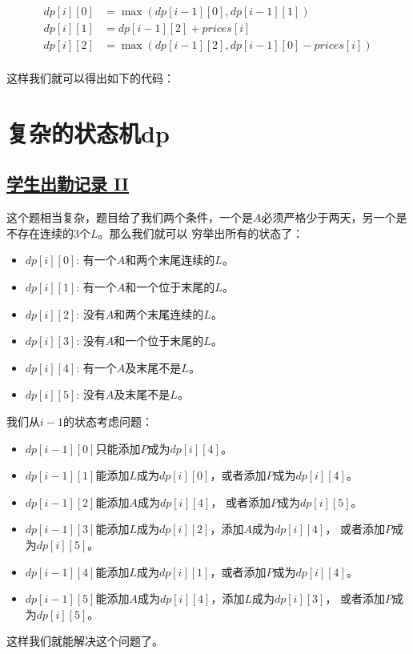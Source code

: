 \documentclass[../../main.tex]{subfiles}
\begin{document}
\begin{align*}
  dp[i][0] &= \max(dp[i - 1][0], dp[i - 1][1]) \\
  dp[i][1] &= dp[i - 1][2] + prices[i] \\
  dp[i][2] &= \max(dp[i - 1][2], dp[i - 1][0] - prices[i]) \\
\end{align*}

这样我们就可以得出如下的代码：



\section{复杂的状态机dp}

\subsection{\href{https://leetcode.cn/problems/student-attendance-record-ii/}{学生出勤记录 II}}

这个题相当复杂，题目给了我们两个条件，一个是$A$必须严格少于两天，另一个是不存在连续的3个$L$。那么我们就可以
穷举出所有的状态了：

\begin{itemize}
  \item $dp[i][0]$: 有一个$A$和两个末尾连续的$L$。
  \item $dp[i][1]$: 有一个$A$和一个位于末尾的$L$。
  \item $dp[i][2]$: 没有$A$和两个末尾连续的$L$。
  \item $dp[i][3]$: 没有$A$和一个位于末尾的$L$。
  \item $dp[i][4]$: 有一个$A$及末尾不是$L$。
  \item $dp[i][5]$: 没有$A$及末尾不是$L$。
\end{itemize}

我们从$i - 1$的状态考虑问题：

\begin{itemize}
  \item $dp[i-1][0]$只能添加$P$成为$dp[i][4]$。
  \item $dp[i-1][1]$能添加$L$成为$dp[i][0]$，或者添加$P$成为$dp[i][4]$。
  \item $dp[i-1][2]$能添加$A$成为$dp[i][4]$， 或者添加$P$成为$dp[i][5]$。
  \item $dp[i-1][3]$能添加$L$成为$dp[i][2]$，添加$A$成为$dp[i][4]$，
  或者添加$P$成为$dp[i][5]$。
  \item $dp[i-1][4]$能添加$L$成为$dp[i][1]$，或者添加$P$成为$dp[i][4]$。
  \item $dp[i-1][5]$能添加$A$成为$dp[i][4]$，添加$L$成为$dp[i][3]$，
  或者添加$P$成为$dp[i][5]$。
\end{itemize}

这样我们就能解决这个问题了。


\end{document}
